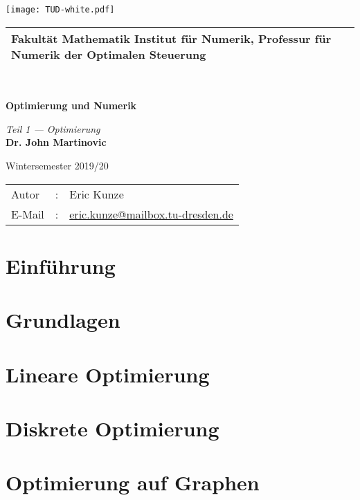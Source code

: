 \documentclass[ngerman, a4paper, 11pt]{report}
\institute{Numerik}
\makeatletter
\renewcommand{\makeTUtitle}{%
	\begin{titlepage}
		\pagecolor{cddarkblue!90}%
		\color{white}%
		
		\raggedright%
		\fosfamily%
		\setlength{\parindent}{0pt}%

		
		\hspace{-18.6mm}
		\texttt{[image: TUD-white.pdf]}%
		\vspace{3mm} 
		\begin{tabular}{m{\textwidth}}
			\hline
			\hspace{-4pt}\small{\textbf{Fakultät Mathematik} Institut für Numerik, Professur für Numerik der Optimalen Steuerung} \\
			\hline
		\end{tabular} \\
	
		\vspace{5cm}
		{\Huge\bfseries \MakeUppercase Optimierung und Numerik \par}
		\vspace{0.5cm}%
		{\Large \itshape Teil 1 --- Optimierung} \\%
		
		\vspace{1.5cm}
		\textbf{{\Large Dr. John Martinovic}} \par
		\vspace{0.5cm}
		{\large Wintersemester 2019/20}
		
		
		
		\vfill%
		\begin{tabular}{lll}
			Autor  & : & Eric Kunze \\
			E-Mail & : & \url{eric.kunze@mailbox.tu-dresden.de} \\
		\end{tabular}%
	\end{titlepage}
	\nopagecolor
}
\makeatother
\begin{document}
\makeTUtitle
    
\tableofcontents

\chapter{Einführung}
\label{chapter_1_einfuehrung}




\chapter{Grundlagen}
\label{chapter_2_grundlagen}




\chapter{Lineare Optimierung}
\label{chapter_3_lineareOptimierung}







\chapter{Diskrete Optimierung}
\label{chapter_4_diskreteOptimierung}





%
\chapter{Optimierung auf Graphen}
\label{chapter_5_optimierungGraphen}





\end{document}
